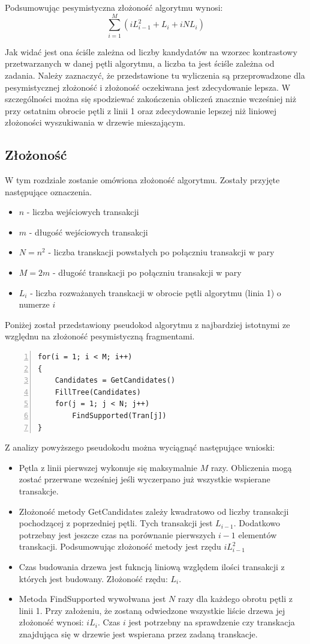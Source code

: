 \documentclass[a4paper,12pt]{article}
\begin{document}
Podsumowując pesymistyczna złożoność algorytmu wynosi:
$$ \sum_{i=1}^M (iL_{i-1}^2 + L_i + iNL_i) $$

Jak widać jest ona ściśle zależna od liczby kandydatów na wzorzec kontrastowy przetwarzanych w danej pętli algorytmu, a liczba ta jest ściśle zależna od zadania. Należy zaznaczyć, że przedstawione tu wyliczenia są przeprowadzone dla pesymistycznej złożoność i złożoność oczekiwana jest zdecydowanie lepsza. W szczególności można się spodziewać zakończenia obliczeń znacznie wcześniej niż przy ostatnim obrocie pętli z linii 1 oraz zdecydowanie lepszej niż liniowej złożoności wyszukiwania w drzewie mieszającym.

\subsection{Złożoność}
W tym rozdziale zostanie omówiona złożoność algorytmu. Zostały przyjęte następujące oznaczenia.
\begin{itemize}
\item $ n$ - liczba wejściowych transakcji
\item $ m$ - długość wejściowych transakcji
\item $ N = n^2$ - liczba transkacji powstałych po połączniu transakcji w pary
\item $ M = 2m$ - długość transkacji po połączniu transakcji w pary
\item $ L_i$ - liczba rozważanych transkacji w obrocie pętli algorytmu (linia 1) o numerze $i$
\end{itemize}
Poniżej został przedstawiony pseudokod algorytmu z najbardziej istotnymi ze względnu na złożoność pesymistyczną fragmentami.
\begin{lstlisting}[numbers=left]
for(i = 1; i < M; i++)
{
	Candidates = GetCandidates()
	FillTree(Candidates)
	for(j = 1; j < N; j++)
		FindSupported(Tran[j])
}
\end{lstlisting}

Z analizy powyższego pseudokodu można wyciągnąć następujące wnioski:
\begin{itemize}
\item Pętla z linii pierwszej wykonuje się maksymalnie $M$ razy. Obliczenia mogą zostać przerwane wcześniej jeśli wyczerpano już wszystkie wspierane transakcje.
\item Złożoność metody GetCandidates zależy kwadratowo od liczby transakcji pochodzącej z poprzedniej pętli. Tych transakcji jest $L_{i-1}$. Dodatkowo potrzebny jest jeszcze czas na porównanie pierwszych $i-1$ elementów transkacji. Podsumowując złożoność metody jest rzędu $iL_{i-1}^2$
\item Czas budowania drzewa jest fukncją liniową względem ilości transakcji z których jest budowany. Złożoność rzędu: $L_i$.
\item Metoda FindSupported wywołwana jest $N$ razy dla każdego obrotu pętli z linii 1.  Przy założeniu, że zostaną odwiedzone wszystkie liście drzewa jej złożoność wynosi: $iL_i$. Czas $i$ jest potrzebny na sprawdzenie czy transkacja znajdująca się w drzewie jest wspierana przez zadaną transkacje.
\end{itemize}
\end{document}
